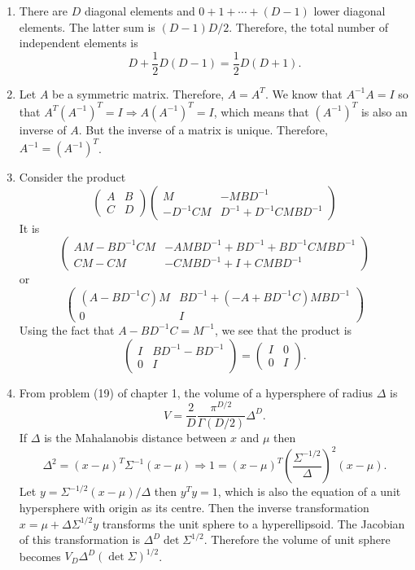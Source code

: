 \begin{enumerate}
\item There are $D$ diagonal elements and $0 + 1 + \cdots + (D - 1)$ lower diagonal elements. The
latter sum is $(D - 1)D/2$. Therefore, the total number of independent elements is
\[
D + \frac{1}{2}D(D - 1) = \frac{1}{2}D(D + 1).
\]

\item Let $A$ be a symmetric matrix. Therefore, $A = A^T$. We know that $A^{-1}A = I$ so that
$A^T(A^{-1})^T = I \Rightarrow A (A^{-1})^T = I$, which means that $(A^{-1})^T$ is also an inverse
of $A$. But the inverse of a matrix is unique. Therefore, $A^{-1} = (A^{-1})^T$.

\item Consider the product
\[
\begin{pmatrix} A & B \\ C & D\end{pmatrix}\begin{pmatrix} M & -MBD^{-1} \\ -D^{-1}CM & D^{-1}+D^{-1}CMBD^{-1}\end{pmatrix}
\]
It is
\[
\begin{pmatrix}
AM - BD^{-1}CM & -AMBD^{-1} + BD^{-1} + BD^{-1}CMBD^{-1} \\ 
CM -CM & -CMBD^{-1} + I + CMBD^{-1}
\end{pmatrix}
\]
or
\[
\begin{pmatrix}
(A - BD^{-1}C)M & BD^{-1} + (-A+BD^{-1}C)MBD^{-1} \\
0 & I
\end{pmatrix}
\]
Using the fact that $A - BD^{-1}C = M^{-1}$, we see that the product is
\[
\begin{pmatrix}I & BD^{-1} - BD^{-1} \\ 0 & I \end{pmatrix} = \begin{pmatrix}I&0\\0&I\end{pmatrix}.
\]

\item From problem (19) of chapter 1, the volume of a hypersphere of radius $\Delta$ is
\[
V = \frac{2}{D}\frac{\pi^{D/2}}{\Gamma(D/2)}\Delta^D.
\]
If $\Delta$ is the Mahalanobis distance between $x$ and $\mu$ then
\[
\Delta^2 = (x - \mu)^T\Sigma^{-1}(x - \mu) \Rightarrow 1 = (x - \mu)^T\left(\frac{\Sigma^{-1/2}}{\Delta}\right)^2(x - \mu).
\]
Let $y = \Sigma^{-1/2}(x - \mu)/\Delta$ then $y^Ty = 1$, which is also the equation of a
unit hypersphere with origin as its centre. Then the inverse transformation $x = \mu + \Delta\Sigma^{1/2}y$
transforms the unit sphere to a hyperellipsoid. The Jacobian of this transformation is $\Delta^D\det\Sigma^{1/2}$.
Therefore the volume of unit sphere becomes $V_D\Delta^D(\det\Sigma)^{1/2}$. 


\end{enumerate}
